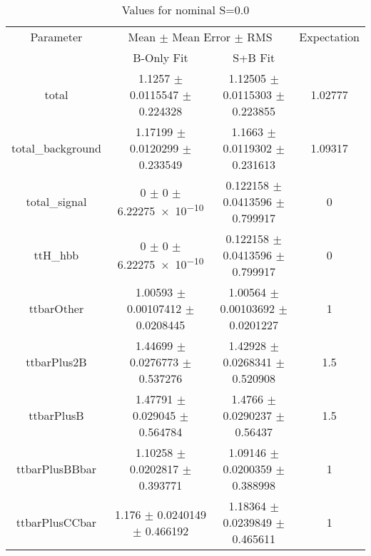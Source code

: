 \begin{table}
\centering
\caption{Values for nominal S=0.0}
\begin{tabular}{cccc}
\toprule
Parameter & \multicolumn{2}{c}{Mean $\pm$ Mean Error $\pm$ RMS} & Expectation\\
 & B-Only Fit & S+B Fit & \\
\midrule
total & \num{1.1257} $\pm$ \num{0.0115547} $\pm$ \num{0.224328} & \num{1.12505} $\pm$ \num{0.0115303} $\pm$ \num{0.223855} & \num{1.02777}\\
total\_background & \num{1.17199} $\pm$ \num{0.0120299} $\pm$ \num{0.233549} & \num{1.1663} $\pm$ \num{0.0119302} $\pm$ \num{0.231613} & \num{1.09317}\\
total\_signal & \num{0} $\pm$ \num{0} $\pm$ \num{6.22275e-10} & \num{0.122158} $\pm$ \num{0.0413596} $\pm$ \num{0.799917} & \num{0}\\
ttH\_hbb & \num{0} $\pm$ \num{0} $\pm$ \num{6.22275e-10} & \num{0.122158} $\pm$ \num{0.0413596} $\pm$ \num{0.799917} & \num{0}\\
ttbarOther & \num{1.00593} $\pm$ \num{0.00107412} $\pm$ \num{0.0208445} & \num{1.00564} $\pm$ \num{0.00103692} $\pm$ \num{0.0201227} & \num{1}\\
ttbarPlus2B & \num{1.44699} $\pm$ \num{0.0276773} $\pm$ \num{0.537276} & \num{1.42928} $\pm$ \num{0.0268341} $\pm$ \num{0.520908} & \num{1.5}\\
ttbarPlusB & \num{1.47791} $\pm$ \num{0.029045} $\pm$ \num{0.564784} & \num{1.4766} $\pm$ \num{0.0290237} $\pm$ \num{0.56437} & \num{1.5}\\
ttbarPlusBBbar & \num{1.10258} $\pm$ \num{0.0202817} $\pm$ \num{0.393771} & \num{1.09146} $\pm$ \num{0.0200359} $\pm$ \num{0.388998} & \num{1}\\
ttbarPlusCCbar & \num{1.176} $\pm$ \num{0.0240149} $\pm$ \num{0.466192} & \num{1.18364} $\pm$ \num{0.0239849} $\pm$ \num{0.465611} & \num{1}\\
\bottomrule
\end{tabular}
\end{table}